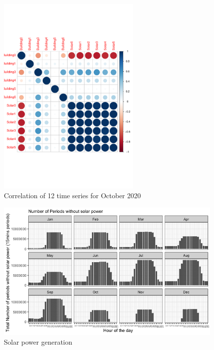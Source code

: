 \documentclass[conference]{IEEEtran}
\begin{document}
\begin{figure}[htbp]
       \centerline{\includegraphics[trim=0 100 0 0, clip ,width=7cm]{Figures/corr-building-solar.pdf}}
\caption{Correlation of 12 time series for October 2020}
\label{fig:corr}
\end{figure}


\begin{figure}[htbp]
\centerline{\includegraphics[scale=0.375]{solar0.png}}
\caption{Solar power generation}
\label{fig:solar0}
\end{figure}

\end{document}
